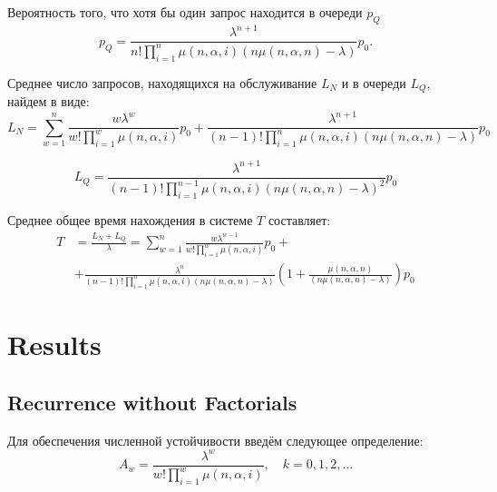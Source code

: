 \documentclass[12pt]{article}
\begin{document}
Вероятность того, что хотя бы один запрос находится в очереди $p_Q$
\begin{equation}
  p_Q=\frac{\lambda^{n+1}} {n! \prod_{i=1}^{n}\mu\left(n,\alpha,i\right) \left(n\mu(n,\alpha,n)-\lambda\right)} p_0.
  \label{eq:p_Q}
\end{equation}


Среднее число запросов, находящихся на обслуживание $L_N$ и в очереди $L_Q$, найдем в виде:
\begin{equation}
  L_N = \sum_{w=1}^{n} \frac{w\lambda^w}{w!\prod_{i=1}^{w}\mu\left(n,\alpha,i\right)} p_0
  +\frac{\lambda^{n+1}}{\left(n-1\right)! \prod_{i=1}^{n}\mu\left(n,\alpha,i\right) \left(n\mu\left(n,\alpha,n\right)-\lambda\right)} p_0
\end{equation}

\begin{equation}
  L_Q=\frac{\lambda^{n+1}} {\left(n-1\right)! \prod_{i=1}^{n-1}\mu\left(n,\alpha,i\right)\left(n\mu\left(n,\alpha,n\right)-\lambda\right)^2} p_0
\end{equation}

Среднее общее время нахождения в системе $T$ составляет:
\begin{align}
  T & = \frac{L_N + L_Q}{\lambda}= \sum_{w=1}^{n} \frac{w\lambda^{w-1}}{w!\prod_{i=1}^{w}\mu\left(n,\alpha,i\right)} p_0 + \nonumber                                                                                                          \\
    & + \frac{\lambda^n}{\left(n-1\right)! \prod_{i=1}^{n}{\mu\left(n,\alpha,i\right) \left(n\mu\left(n,\alpha,n\right)-\lambda\right)}}\left(1+\frac{\mu\left(n,\alpha,n\right)}{\left(n\mu\left(n,\alpha,n\right)-\lambda\right)}\right)p_0
  \label{eq:T}
\end{align}


\section{Results}


\subsection{Recurrence without Factorials}
Для обеспечения численной устойчивости введём следующее определение:
\[
  A_w = \frac{\lambda^w}{w! \prod_{i=1}^{w}\mu(n,\alpha,i)}, \quad k = 0, 1, 2, \dots
\]
\end{document}
